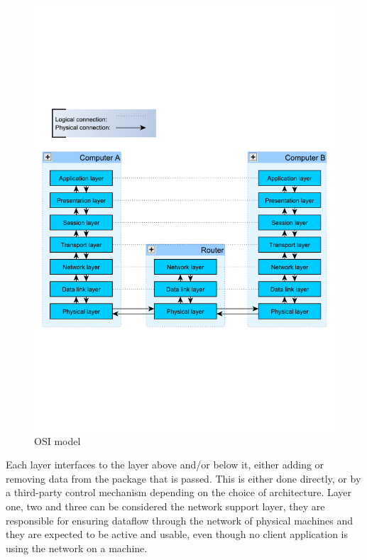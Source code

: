 \begin{figure}[htb]
	\begin{center}
	\includegraphics[scale=0.5,trim=0 200 0 200]{content/graphics/OsiStack.pdf} %
	\caption{OSI model}
	\label{fig:osi_model_stack}			%
	\end{center}
\end{figure}


Each layer interfaces to the layer above and/or below it, either adding or removing data from the package that is passed. This is either done directly, or by a third-party control mechanism depending on the choice of architecture.
Layer one, two and three can be considered the network support layer, they are responsible for ensuring dataflow through the network of physical machines and they are expected to be active and usable, even though no client application is using the network on a machine.

